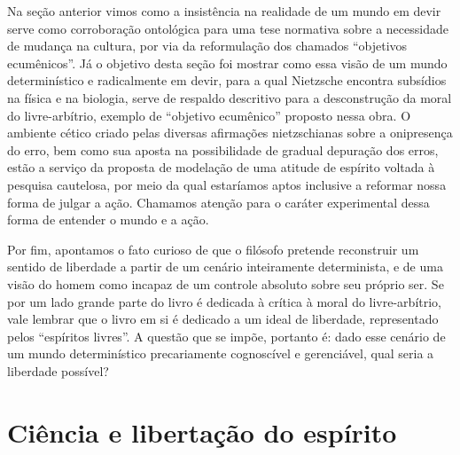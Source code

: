 \documentclass[
	12pt,				%
	openright,			%
	oneside,			%
	a4paper,			%
	english,			%
	french,				%
	spanish,			%
	brazil				%
	]{abntex2}
\begin{document}
	Na seção anterior vimos como a insistência na realidade de um mundo em devir serve como corroboração ontológica para uma tese normativa sobre a necessidade de mudança na cultura, por via da reformulação dos chamados “objetivos ecumênicos”. Já o objetivo desta seção foi mostrar como essa visão de um mundo determinístico e radicalmente em devir, para a qual Nietzsche encontra subsídios na física e na biologia, serve de respaldo descritivo para a desconstrução da moral do livre-arbítrio, exemplo de “objetivo ecumênico” proposto nessa obra. O ambiente cético criado pelas diversas afirmações nietzschianas sobre a onipresença do erro, bem como sua aposta na possibilidade de gradual depuração dos erros, estão a serviço da proposta de modelação de uma atitude de espírito voltada à pesquisa cautelosa, por meio da qual estaríamos aptos inclusive a reformar nossa forma de julgar a ação. Chamamos atenção para o caráter experimental dessa forma de entender o mundo e a ação. 

Por fim, apontamos o fato curioso de que o filósofo pretende reconstruir um sentido de liberdade a partir de um cenário inteiramente determinista, e de uma visão do homem como incapaz de um controle absoluto sobre seu próprio ser. Se por um lado grande parte do livro é dedicada à crítica à moral do livre-arbítrio, vale lembrar que o livro em si é dedicado a um ideal de liberdade, representado pelos “espíritos livres”. A questão que se impõe, portanto é: dado esse cenário de um mundo determinístico precariamente cognoscível e gerenciável, qual seria a liberdade possível? 

\section{Ciência e libertação do espírito}
\end{document}
